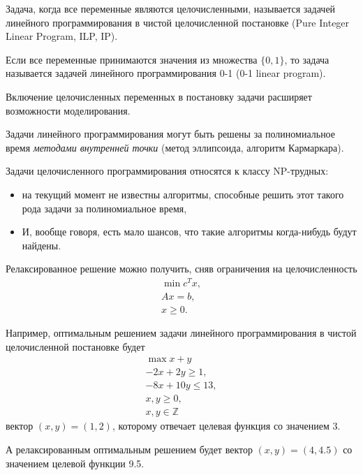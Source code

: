 \documentclass[%
	11pt,
	a4paper,
	utf8,
		]{article}
\begin{document}
Задача, когда все переменные являются целочисленными, называется задачей линейного программирования в чистой целочисленной постановке (Pure Integer Linear Program, ILP, IP).

Если все переменные принимаются значения из множества $ \{ 0, 1 \} $, то задача называется задачей линейного программирования 0-1 (0-1 linear program).

Включение целочисленных переменных в постановку задачи расширяет возможности моделирования.

Задачи линейного программирования могут быть решены за полиномиальное время \emph{методами внутренней точки} (метод эллипсоида, алгоритм Кармаркара). 

Задачи целочисленного программирования относятся к классу NP-трудных:
\begin{itemize}
	\item на текущий момент не известны алгоритмы, способные решить этот такого рода задачи за полиномиальное время,
	
	\item И, вообще говоря, есть мало шансов, что такие алгоритмы когда-нибудь будут найдены.
\end{itemize}

Релаксированное решение можно получить, сняв ограничения на целочисленность
\begin{align*}
	\min c^T x,\\
	Ax = b,\\
	x \geqslant 0.
\end{align*}


Например, оптимальным решением задачи линейного программирования в чистой целочисленной постановке будет
\begin{align*}
	\max x + y\\
	-2x + 2 y \geqslant 1,\\
	-8 x + 10 y \leqslant 13,\\
	x,y \geqslant 0,\\
	x,y \in \mathbb{Z}
\end{align*}
вектор $ (x, y) = (1, 2) $, которому отвечает целевая функция со значением 3.

А релаксированным оптимальным решением будет вектор $ (x, y) = (4, 4.5) $ со значением целевой функции 9.5. 
\end{document}
